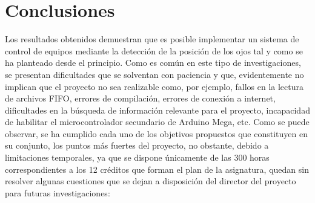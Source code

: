 
\chapter{Conclusiones} \label{cap5}

Los resultados obtenidos demuestran que es posible implementar un sistema de control de equipos mediante la detección de la posición de los ojos tal y como se ha planteado desde el principio. Como es común en este tipo de investigaciones, se presentan dificultades que se solventan con paciencia y que, evidentemente no implican que el proyecto no sea realizable como, por ejemplo, fallos en la lectura de archivos FIFO, errores de compilación, errores de conexión a internet, dificultades en la búsqueda de información relevante para el proyecto, incapacidad de habilitar el microcontrolador secundario de Arduino Mega, etc. Como se puede observar, se ha cumplido cada uno de los objetivos propuestos que constituyen en su conjunto, los puntos más fuertes del proyecto, no obstante, debido a limitaciones temporales, ya que se dispone únicamente de las 300 horas correspondientes a los 12 créditos que forman el plan de la asignatura, quedan sin resolver algunas cuestiones que se dejan a disposición del director del proyecto para futuras investigaciones:

